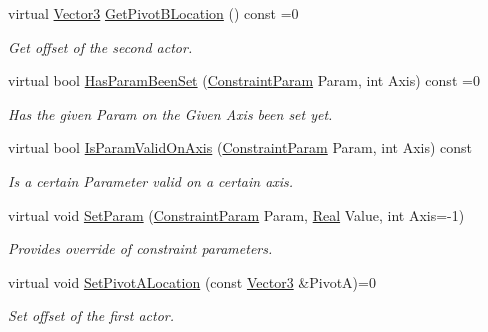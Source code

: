 \begin{DoxyCompactItemize}
virtual \hyperlink{classMezzanine_1_1Vector3}{Vector3} \hyperlink{classMezzanine_1_1TypedConstraint_a2c0984d3211b30756c7ec5263c99b014}{GetPivotBLocation} () const =0
\begin{DoxyCompactList}\small\item\em Get offset of the second actor. \item\end{DoxyCompactList}\item 
virtual bool \hyperlink{classMezzanine_1_1TypedConstraint_a96a6b4c16521f24d72feea98044ef3a8}{HasParamBeenSet} (\hyperlink{namespaceMezzanine_a6c62e8c2938fb203eb7a7072c12176f4}{ConstraintParam} Param, int Axis) const =0
\begin{DoxyCompactList}\small\item\em Has the given Param on the Given Axis been set yet. \item\end{DoxyCompactList}\item 
virtual bool \hyperlink{classMezzanine_1_1TypedConstraint_aeaaffe002055651f3db3e9150fe5a114}{IsParamValidOnAxis} (\hyperlink{namespaceMezzanine_a6c62e8c2938fb203eb7a7072c12176f4}{ConstraintParam} Param, int Axis) const 
\begin{DoxyCompactList}\small\item\em Is a certain Parameter valid on a certain axis. \item\end{DoxyCompactList}\item 
virtual void \hyperlink{classMezzanine_1_1TypedConstraint_aacb29d66ce974798bbc902d49a3025cc}{SetParam} (\hyperlink{namespaceMezzanine_a6c62e8c2938fb203eb7a7072c12176f4}{ConstraintParam} Param, \hyperlink{namespaceMezzanine_a726731b1a7df72bf3583e4a97282c6f6}{Real} Value, int Axis=-\/1)
\begin{DoxyCompactList}\small\item\em Provides override of constraint parameters. \item\end{DoxyCompactList}\item 
virtual void \hyperlink{classMezzanine_1_1TypedConstraint_a09aacdc6f424623cc3a2fdad9c1d0caf}{SetPivotALocation} (const \hyperlink{classMezzanine_1_1Vector3}{Vector3} \&PivotA)=0
\begin{DoxyCompactList}\small\item\em Set offset of the first actor. \item\end{DoxyCompactList}\item 

\end{DoxyCompactItemize}
